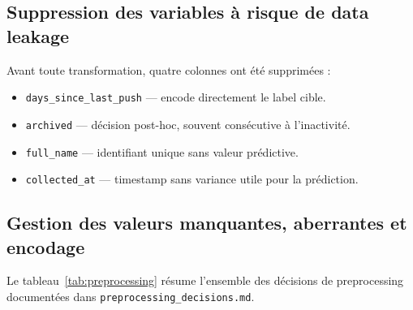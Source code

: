 \documentclass[12pt,a4paper]{article}
\begin{document}
\subsection{Suppression des variables à risque de data leakage}

Avant toute transformation, quatre colonnes ont été supprimées :

\begin{itemize}[noitemsep]
  \item \texttt{days\_since\_last\_push} --- encode directement le label cible.
  \item \texttt{archived} --- décision post-hoc, souvent consécutive à l'inactivité.
  \item \texttt{full\_name} --- identifiant unique sans valeur prédictive.
  \item \texttt{collected\_at} --- timestamp sans variance utile pour la prédiction.
\end{itemize}

\subsection{Gestion des valeurs manquantes, aberrantes et encodage}

Le tableau~\ref{tab:preprocessing} résume l'ensemble des décisions de preprocessing documentées dans
\texttt{preprocessing\_decisions.md}.
\end{document}

